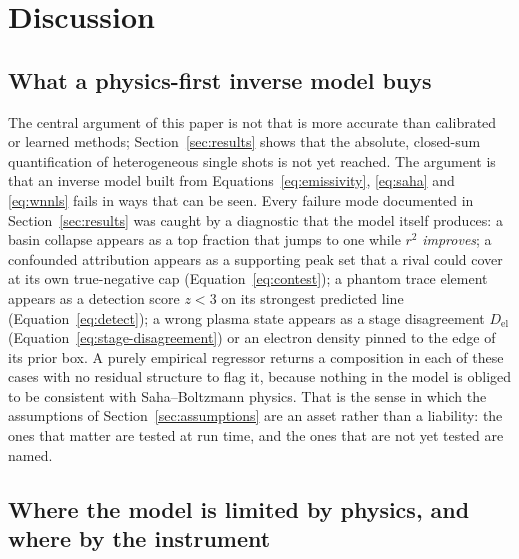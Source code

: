 \section{Discussion}
\label{sec:discussion}

\subsection{What a physics-first inverse model buys}

The central argument of this paper is not that \alibz{} is more accurate than
calibrated or learned methods; Section~\ref{sec:results} shows that the absolute,
closed-sum quantification of heterogeneous single shots is not yet reached. The
argument is that an inverse model built from Equations~\eqref{eq:emissivity},
\eqref{eq:saha} and \eqref{eq:wnnls} fails in ways that can be seen. Every failure
mode documented in Section~\ref{sec:results} was caught by a diagnostic that the
model itself produces: a basin collapse appears as a top fraction that jumps to one
while $r^2$ \emph{improves}; a confounded attribution appears as a supporting peak set
that a rival could cover at its own true-negative cap (Equation~\eqref{eq:contest});
a phantom trace element appears as a detection score $z<3$ on its strongest predicted
line (Equation~\eqref{eq:detect}); a wrong plasma state appears as a stage
disagreement $D_\mathrm{el}$ (Equation~\eqref{eq:stage-disagreement}) or an electron
density pinned to the edge of its prior box. A purely empirical regressor
\citep{clegg2009pls,li2020cnn} returns a composition in each of these cases with no
residual structure to flag it, because nothing in the model is obliged to be
consistent with Saha--Boltzmann physics. That is the sense in which the assumptions of
Section~\ref{sec:assumptions} are an asset rather than a liability: the ones that
matter are tested at run time, and the ones that are not yet tested are named.

\subsection{Where the model is limited by physics, and where by the instrument}


